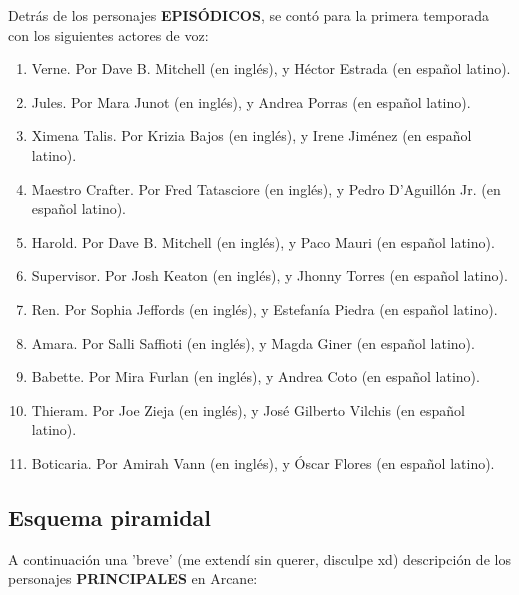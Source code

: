 \documentclass[11pt,A5]{article}
\begin{document}
Detrás de los personajes {\textbf{EPISÓDICOS}}, se contó para la primera temporada con los siguientes actores de voz:

\begin{enumerate}
    \item Verne. Por Dave B. Mitchell (en inglés), y Héctor Estrada (en español latino).
    \item Jules. Por Mara Junot (en inglés), y Andrea Porras (en español latino).
    \item Ximena Talis. Por Krizia Bajos (en inglés), y Irene Jiménez (en español latino).
    \item Maestro Crafter. Por Fred Tatasciore	 (en inglés), y Pedro D'Aguillón Jr. (en español latino).
    \item Harold. Por Dave B. Mitchell (en inglés), y Paco Mauri (en español latino).
    \item Supervisor. Por Josh Keaton (en inglés), y Jhonny Torres (en español latino).
    \item Ren. Por Sophia Jeffords (en inglés), y Estefanía Piedra (en español latino).
    \item Amara. Por Salli Saffioti (en inglés), y Magda Giner (en español latino).
    \item Babette. Por Mira Furlan (en inglés), y Andrea Coto (en español latino).
    \item Thieram. Por Joe Zieja (en inglés), y José Gilberto Vilchis (en español latino).
    \item Boticaria. Por Amirah Vann (en inglés), y Óscar Flores (en español latino).
\end{enumerate}

    \subsection*{{\large{\textsf{\hspace{1cm}Esquema piramidal}}}}

A continuación una 'breve' (me extendí sin querer, disculpe xd) descripción de los personajes {\textbf{PRINCIPALES}} en Arcane:
\end{document}
